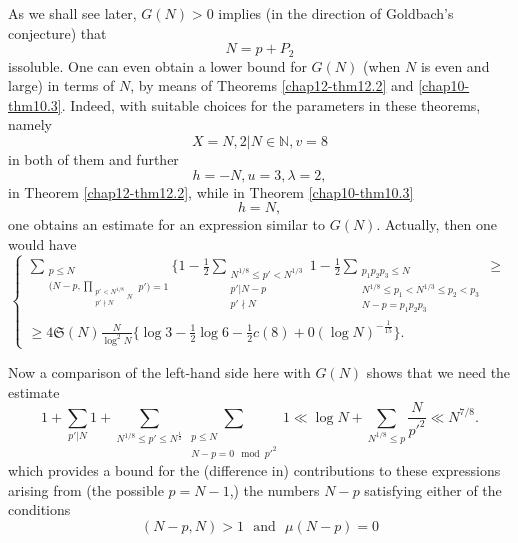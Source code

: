 As we shall see later, $G(N)>0$ implies (in the direction of Goldbach's
conjecture) that
 \begin{equation*}
N = p + P_2 \tag{13.2}\label{eq13.2}
\end{equation*} 
is\pageoriginale soluble. One can even obtain a lower bound for
$G(N)$ (when $N$ is even and large) in terms of $N$, by means of
Theorems \ref{chap12-thm12.2} and \ref{chap10-thm10.3}. 
Indeed, with suitable choices for the
parameters in these theorems, namely 
\begin{equation*}
X=N,2 | N \in \mathbb{N}, v=8 \tag{13.3}\label{eq13.3}
\end{equation*} 
in both of them and further
\begin{equation*}
h=-N, u=3, \lambda=2, \tag{13.4}\label{eq13.4}
\end{equation*} 
in Theorem \ref{chap12-thm12.2}, while in Theorem \ref{chap10-thm10.3}
\begin{equation*}
h=N, \tag{13.5}\label{eq13.5}
\end{equation*} 
 one obtains an estimate for an expression similar to
 $G(N)$. Actually, then one would have 
\begin{equation*}
\begin{cases}
\sum\limits_{\substack{p \leq N \\ (N-p,
    \prod\limits_{\substack{p'<N^{1/8}\\p' \nmid  N }
        N}}p')=1}\big \{1-\frac{1}{2} \sum\limits_{\substack{N^{1/8}
    \leq p' < N^{1/3}\\p' |N-p \\p' \nmid N}}1-
\frac{1}{2}\sum\limits_{\substack{p_1p_2p_3 \leq N \\ N^{1/8} \leq
    p_1<N^{1/3}\leq p_2<p_3\\N-p=p_1p_2p_3}} \geq \\ \geq
4\mathfrak{S}(N)\frac{N}{\log^2 N}\{\log 3-\frac{1}{2} \log
6-\frac{1}{2}c(8)+0(\log N)^{-\frac{1}{15}}\}.  
\end{cases}\tag{13.6}\label{eq13.6}
 \end{equation*}
 
Now a comparison of the left-hand side here with $G(N)$ shows that we
need the estimate 
 \begin{equation*}
1+\sum_{p'|N}1+ \sum _{N^{1/8} \leq p' \leq N^{\frac{1}{2}}}
\sum_{\substack{p \leq N \\ N-p=0 \mod p'^2}} 1 \ll \log N+
\sum_{N^{1/8}\leq p}\frac{N}{p'^2} \ll N^{7/8}. \tag{13.7}\label{eq13.7} 
\end{equation*}  
which provides a bound for the (difference in) contributions to these
expressions arising from (the possible $p=N -1$,) the numbers $N-p$
satisfying either of the conditions 
\begin{equation*}
(N-p, N)>1 \text{~ and~ } \mu (N-p)=0 \tag{13.8}\label{eq13.8}
\end{equation*}  

